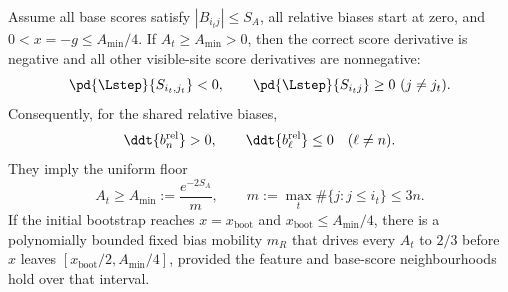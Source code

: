 \begin{lemma}
\label{lem:lr-bias-learning}
Assume all base scores satisfy $|B_{i_tj}|\le S_A$,
all relative biases start at zero, and
$0<x=-g\le A_{\min}/4$. If $A_t\ge A_{\min}>0$,
then the correct score derivative is negative and all other visible-site
score derivatives are nonnegative:
\begin{equation}\label{eq:lr-smallscore-sign}
 \pd{\Lstep}{S_{i_t,j_t}}<0,\qquad \pd{\Lstep}{S_{i_tj}}\ge0\ (j\ne j_t).
\end{equation}
Consequently, for the shared relative biases,
\begin{equation}\label{eq:lr-beta-routes}
 \ddt{b_n^{\mathrm{rel}}}>0,\qquad
 \ddt{b_\ell^{\mathrm{rel}}}\le0\quad(\ell\ne n).
\end{equation}
They imply the uniform floor
\begin{equation}\label{eq:lr-floor}
 A_t\ge A_{\min}:=\frac{e^{-2S_A}}m,
 \qquad m:=\max_t\#\{j:j\le i_t\}\le3n.
\end{equation}
If the initial bootstrap reaches $x=x_{\mathrm{boot}}$ and
$x_{\mathrm{boot}}\le A_{\min}/4$, there is a polynomially bounded fixed bias
mobility $m_R$ that drives every $A_t$ to $2/3$ before $x$ leaves
$[x_{\mathrm{boot}}/2,A_{\min}/4]$, provided the feature and base-score
neighbourhoods hold over that interval.
\end{lemma}
